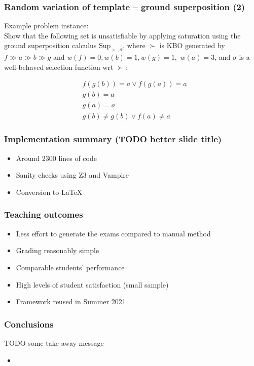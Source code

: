 \documentclass[xcolor={table}]{beamer}
\begin{document}


\begin{frame}
  \frametitle{Random variation of template -- ground superposition (2)}


Example problem instance:\\
  \vspace*{1em}
Show that the following set is unsatisfiable by applying saturation using the
ground superposition calculus $\textrm{Sup}_{\succ,\sigma}$, where
$\succ$ is KBO generated by 
$f \gg a \gg b \gg g$
and
$w(f) = 0, w(b) = 1, w(g) = 1,$ $w(a) = 3$,
and $\sigma$ is a well-behaved selection function wrt $\succ$:

\begin{align*}
& f(g(b)) = a \lor f(g(a)) = a
~\\~
& g(b) = a
~\\~
& g(a) = a
~\\~
& g(b)  \neq  g(b) \lor f(a)  \neq  a
\end{align*}


\end{frame}



\begin{frame}
\frametitle{Implementation summary (TODO better slide title)}
\begin{itemize}
\item Around 2300 lines of code
\item Sanity checks using Z3 and Vampire
\item Conversion to \LaTeX
\end{itemize}
\end{frame}



\begin{frame}
\frametitle{Teaching outcomes}
\begin{itemize}
\item Less effort to generate the exams compared to manual method
\item Grading reasonably simple
\item Comparable students' performance
\item High levels of student satisfaction (small sample)
\item Framework reused in Summer 2021
\end{itemize}
\end{frame}



\begin{frame}
\frametitle{Conclusions}
TODO some take-away message
\begin{itemize}
\item
\end{itemize}
\end{frame}

\end{document}
